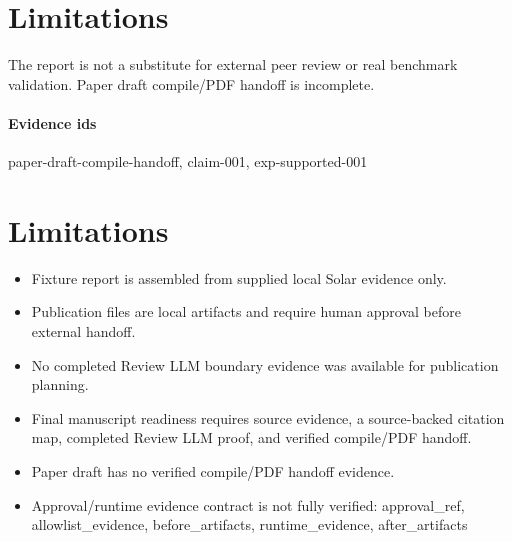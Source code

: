 \documentclass{article}
\begin{document}
\section{Limitations}
The report is not a substitute for external peer review or real benchmark validation. Paper draft compile/PDF handoff is incomplete.

\paragraph{Evidence ids} paper-draft-compile-handoff, claim-001, exp-supported-001

\section{Limitations}

\begin{itemize}\item Fixture report is assembled from supplied local Solar evidence only.\end{itemize}
\begin{itemize}\item Publication files are local artifacts and require human approval before external handoff.\end{itemize}
\begin{itemize}\item No completed Review LLM boundary evidence was available for publication planning.\end{itemize}
\begin{itemize}\item Final manuscript readiness requires source evidence, a source-backed citation map, completed Review LLM proof, and verified compile/PDF handoff.\end{itemize}
\begin{itemize}\item Paper draft has no verified compile/PDF handoff evidence.\end{itemize}
\begin{itemize}\item Approval/runtime evidence contract is not fully verified: approval\_ref, allowlist\_evidence, before\_artifacts, runtime\_evidence, after\_artifacts\end{itemize}
\end{document}
